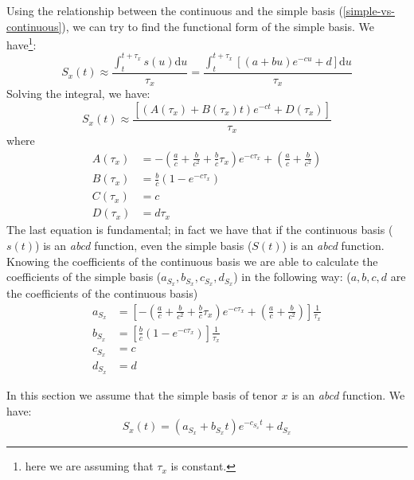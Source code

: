 \documentclass{article}
\begin{document}
\begin{appendices}
Using the relationship between the continuous and the simple basis (\ref{simple-vs-continuous}), we can try to find the functional form of the simple basis. We have\footnote{here we are assuming that $\tau_x$ is constant.}:
\begin{equation}
S_x(t) \approx \frac{\int_t^{t+\tau_x} s(u) \mathrm{d}u}{\tau_x} = \frac{\int_t^{t+\tau_x} [(a + b u)e^{-c  u} + d] \mathrm{d}u}{\tau_x}
\end{equation}
Solving the integral, we have:
\begin{equation}
S_x(t) \approx \frac{[(A(\tau_x) + B(\tau_x) t)e^{-c  t} + D(\tau_x)]}{\tau_x}
\end{equation}
where
\begin{equation}\label{eq:integratedCoef2}
\begin{split}
A(\tau_x)&=-\left(\frac{a}{c}+ \frac{b}{c^{2}}+\frac{b}{c}\tau_x \right)e^{-c\tau_x}+\left(\frac{a}{c}+ \frac{b}{c^{2}}\right) \\
B(\tau_x)&=\frac{b}{c}\left(1-e^{-c\tau_x}\right) \\
C(\tau_x)&= c \\
D(\tau_x)&=d\tau_x
\end{split}
\end{equation}
The last equation is fundamental; in fact we have that if the continuous basis ($s(t)$) is an \textit{abcd} function, even the simple basis ($S(t)$) is an \textit{abcd} function. Knowing the coefficients of the continuous basis we are able to calculate the coefficients of the simple basis ($a_{S_x},b_{S_x},c_{S_x},d_{S_x}$) in the following way: ($a,b,c,d$ are the coefficients of the continuous basis)
\begin{equation} \label{eq:simpleBasisCoef}
\begin{split}
a_{S_x}&=\left[-\left(\frac{a}{c}+ \frac{b}{c^{2}}+\frac{b}{c}\tau_x \right)e^{-c\tau_x}+\left(\frac{a}{c}+ \frac{b}{c^{2}}\right)\right]\frac{1}{\tau_x} \\
b_{S_x}&=\left[\frac{b}{c}\left(1-e^{-c\tau_x}\right)\right]\frac{1}{\tau_x} \\
c_{S_x}&= c \\
d_{S_x}&= d
\end{split}
\end{equation}

In this section we assume that the simple basis of tenor $x$ is an \textit{abcd} function. We have:
\begin{equation}
S_x(t) = (a_{S_x} + b_{S_x} t)e^{-c_{S_x}  t} + d_{S_x}
\end{equation}




\end{appendices}
\end{document}
